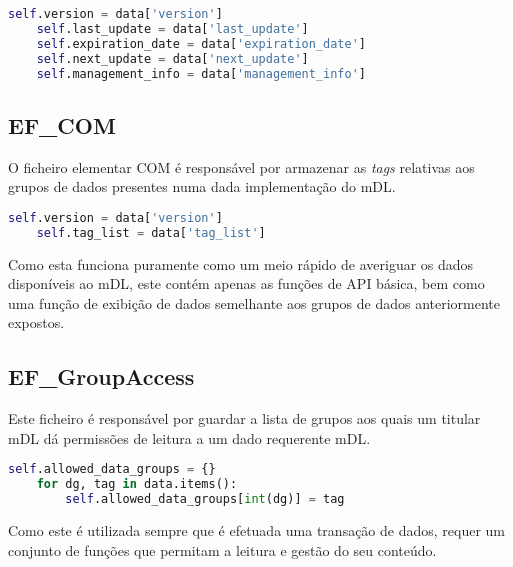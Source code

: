 \begin{lstlisting}[caption=Instanciação dos dados do DG10, language=Python]
    self.version = data['version']
    self.last_update = data['last_update']
    self.expiration_date = data['expiration_date']
    self.next_update = data['next_update']
    self.management_info = data['management_info']
\end{lstlisting}


\subsection{EF_COM}

O ficheiro elementar COM é responsável por armazenar as \textit{tags} relativas aos grupos de dados presentes numa dada implementação do mDL.

\begin{lstlisting}[caption=Instanciação de variáveis no EF.COM, language=Python]
    self.version = data['version']
    self.tag_list = data['tag_list']
\end{lstlisting}

Como esta funciona puramente como um meio rápido de averiguar os dados disponíveis ao mDL, este contém apenas as funções de API básica, bem como uma função de exibição de dados semelhante aos grupos de dados anteriormente expostos.


\subsection{EF_GroupAccess}

Este ficheiro é responsável por guardar a lista de grupos aos quais um titular mDL dá permissões de leitura a um dado requerente mDL.

\begin{lstlisting}[caption=Instanciação dos dados do ficheiro EF.GroupAccess, language=Python]
    self.allowed_data_groups = {}
    for dg, tag in data.items():
        self.allowed_data_groups[int(dg)] = tag
\end{lstlisting}

Como este é utilizada sempre que é efetuada uma transação de dados, requer um conjunto de funções que permitam a leitura e gestão do seu conteúdo.

